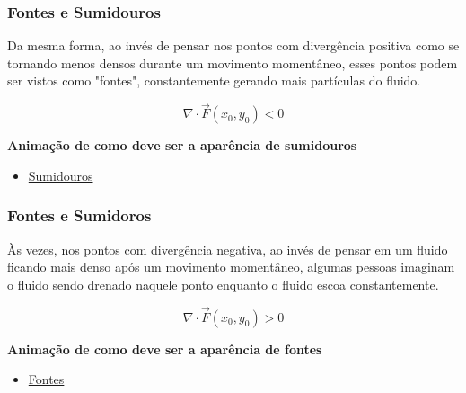 \begin{frame}
    \frametitle{Fontes e Sumidouros}
    \justifying
    Da mesma forma, ao invés de pensar nos pontos com divergência positiva como se tornando menos densos durante um movimento momentâneo, esses pontos podem ser vistos como "fontes", constantemente gerando mais partículas do fluido.
    \vspace{3mm}
    
    \begin{equation*}
        \nabla \cdot \vec{F}(x_0,y_0) < 0
    \end{equation*}
    \vspace{3mm}
    
    \textbf{Animação de como deve ser a aparência de sumidouros}
    \begin{itemize}
        \item \href{https://www.youtube.com/watch?v=4I5R4zhOzmU}{Sumidouros}
    \end{itemize}
    
\end{frame}

\begin{frame}
    \frametitle{Fontes e Sumidoros}
    \justifying
    Às vezes, nos pontos com divergência negativa, ao invés de pensar em um fluido ficando mais denso após um movimento momentâneo, algumas pessoas imaginam o fluido sendo drenado naquele ponto enquanto o fluido escoa constantemente.
    \vspace{3mm}
    
    \begin{equation*}
        \nabla \cdot \vec{F}(x_0,y_0) > 0
    \end{equation*}
    \vspace{3mm}
    
    \textbf{Animação de como deve ser a aparência de fontes}
    \begin{itemize}
        \item \href{https://www.youtube.com/watch?v=mBoezvLrUGw}{Fontes}
    \end{itemize}
    
\end{frame}